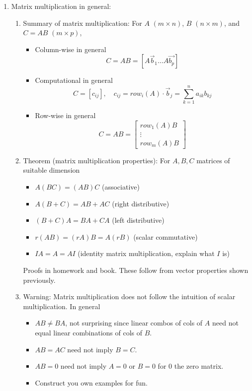 \documentclass{article}
\begin{document}
\begin{enumerate}
\item Matrix multiplication in general:
\begin{enumerate}

\item Summary of matrix multiplication: For $A$ $(m \times n)$, $B$ $(n \times m)$, and $C = AB$ $(m \times p)$,
\begin{itemize}
\item Column-wise in general
\[
C = AB = [A\vec{b}_1 \dots A\vec{b_p}]
\]
\item Computational in general
\[
C = [c_{ij}], \quad c_{ij} = row_i(A) \cdot \vec{b}_j = \sum_{k=1}^n a_{ik} b_{kj}
\]
\item Row-wise in general
\[
C = AB = \left[ 
\begin{array}{c}
row_1(A) B  \\
\vdots  \\
row_m (A) B
\end{array}
\right]
\]
\end{itemize}

\item Theorem (matrix multiplication properties): For $A, B, C$ matrices of suitable dimension
\begin{itemize}
\item $A(BC) = (AB)C$ (associative)
\item $A(B+C) = AB + AC$ (right distributive)
\item $(B+C)A = BA + CA$ (left distributive)
\item $r(AB) = (rA)B = A(rB)$ (scalar commutative)
\item $IA = A = AI$ (identity matrix multiplication, explain what $I$ is)
\end{itemize}
Proofs in homework and book. These follow from vector properties shown previously.

\item Warning: Matrix multiplication does not follow the intuition of scalar multiplication. In general
\begin{itemize}
\item $AB \neq BA$, not surprising since linear combos of cols of $A$ need not equal linear combinations of cols of $B$.
\item $AB=AC$ need not imply $B=C$.
\item $AB=0$ need not imply $A=0$ or $B=0$ for $0$ the zero matrix.
\item Construct you own examples for fun.
\end{itemize}


\end{enumerate}
\end{enumerate}
\end{document}
